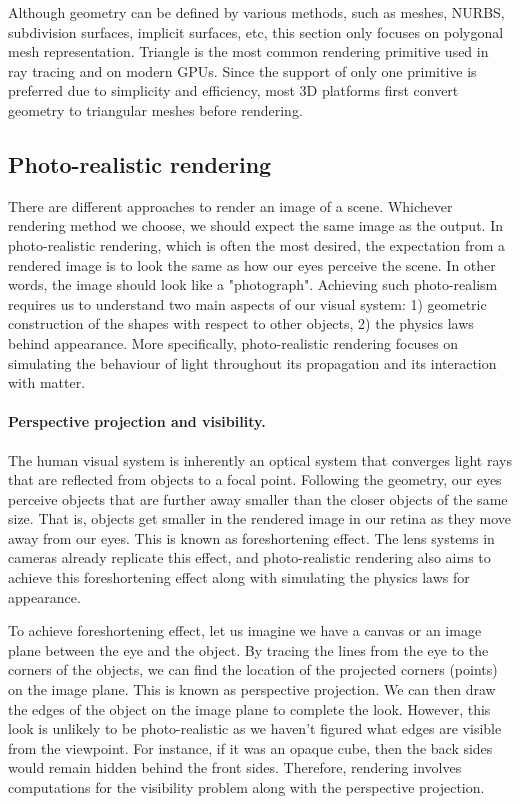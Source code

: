  Although geometry can be defined by various methods, such as meshes, NURBS, subdivision surfaces, implicit surfaces, etc, this section only focuses on polygonal mesh representation. Triangle is the most common rendering primitive used in ray tracing and on modern GPUs. Since the support of only one primitive is preferred due to simplicity and efficiency, most 3D platforms first convert geometry to triangular meshes before rendering.
 
\subsection{Photo-realistic rendering}
There are different approaches to render an image of a scene. Whichever rendering method we choose, we should expect the same image as the output. In photo-realistic rendering, which is often the most desired, the expectation from a rendered image is to look the same as how our eyes perceive the scene. In other words, the image should look like a "photograph". Achieving such photo-realism requires us to understand two main aspects of our visual system: 1) geometric construction of the shapes with respect to other objects, 2) the physics laws behind appearance. More specifically, photo-realistic rendering focuses on simulating the behaviour of light throughout its propagation and its interaction with matter.

\paragraph{Perspective projection and visibility.}

The human visual system is inherently an optical system that converges light rays that are reflected from objects to a focal point. Following the geometry, our eyes perceive objects that are further away smaller than the closer objects of the same size. That is, objects get smaller in the rendered image in our retina as they move away from our eyes. This is known as foreshortening effect. The lens systems in cameras already replicate this effect, and photo-realistic rendering also aims to achieve this foreshortening effect along with simulating the physics laws for appearance.  

To achieve foreshortening effect, let us imagine we have a canvas or an image plane between the eye and the object. By tracing the lines from the eye to the corners of the objects, we can find the location of the projected corners (points) on the image plane. This is known as perspective projection. We can then draw the edges of the object on the image plane to complete the look. However, this look is unlikely to be photo-realistic as we haven't figured what edges are visible from the viewpoint. For instance, if it was an opaque cube, then the back sides would remain hidden behind the front sides. Therefore, rendering involves computations for the visibility problem along with the perspective projection. 


